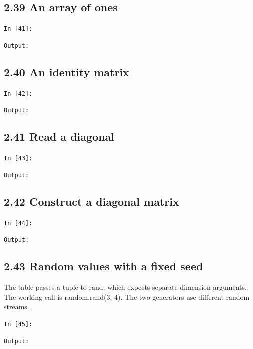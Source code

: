 \documentclass[11pt]{article}
\begin{document}
\par\medskip\noindent\begin{minipage}{\linewidth}
\subsection*{2.39 An array of ones}
\noindent\texttt{In [41]:}

\noindent\texttt{Output:}

\end{minipage}\par

\par\medskip\noindent\begin{minipage}{\linewidth}
\subsection*{2.40 An identity matrix}
\noindent\texttt{In [42]:}

\noindent\texttt{Output:}

\end{minipage}\par

\par\medskip\noindent\begin{minipage}{\linewidth}
\subsection*{2.41 Read a diagonal}
\noindent\texttt{In [43]:}

\noindent\texttt{Output:}

\end{minipage}\par

\par\medskip\noindent\begin{minipage}{\linewidth}
\subsection*{2.42 Construct a diagonal matrix}
\noindent\texttt{In [44]:}

\noindent\texttt{Output:}

\end{minipage}\par

\par\medskip\noindent\begin{minipage}{\linewidth}
\subsection*{2.43 Random values with a fixed seed}
The table passes a tuple to rand, which expects separate dimension arguments. The working call is random.rand(3, 4). The two generators use different random streams.

\noindent\texttt{In [45]:}

\noindent\texttt{Output:}

\end{minipage}\par
\end{document}
